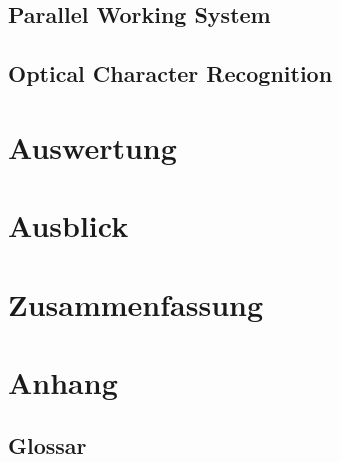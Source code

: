 \documentclass[a4paper,12pt,twoside,openany]{book}
\begin{document}
\newpage

\subsection{Parallel Working System}
\label{subsec:parallelws}


\newpage

\subsection{Optical Character Recognition}
\label{subsec:ocr}


\newpage %

\section{Auswertung}
\label{sec:auswertung}


\newpage



\newpage %

\section{Ausblick}
\label{sec:ausblick}


\newpage %

\section{Zusammenfassung}
\label{sec:zusammenfassung}


\newpage %

\cfoot{}
\section*{Anhang}
\label{sec:anhang}

\subsection*{Glossar}
\label{subsec:glossar}
\begingroup
\renewcommand{\chapter}[2]{}
\printglossary[style=tree]
\endgroup
\newpage
\end{document}
